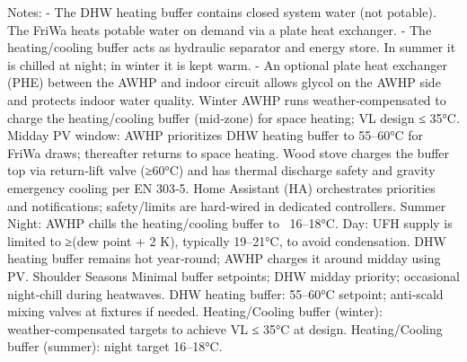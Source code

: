 \markdownRendererDocumentBegin
Notes: - The DHW heating buffer contains closed system water (not potable). The FriWa heats potable water on demand via a plate heat exchanger. - The heating/cooling buffer acts as hydraulic separator and energy store. In summer it is chilled at night; in winter it is kept warm. - An optional plate heat exchanger (PHE) between the AWHP and indoor circuit allows glycol on the AWHP side and protects indoor water quality.\markdownRendererInterblockSeparator
{}\markdownRendererSectionBegin
\markdownRendererSectionBegin
{}\markdownRendererInterblockSeparator
{}\markdownRendererUlBegin
\markdownRendererUlItem Winter\markdownRendererUlItemEnd 
\markdownRendererUlItem AWHP runs weather‑compensated to charge the heating/cooling buffer (mid‑zone) for space heating; VL design ≤ 35°C.\markdownRendererUlItemEnd 
\markdownRendererUlItem Midday PV window: AWHP prioritizes DHW heating buffer to 55–60°C for FriWa draws; thereafter returns to space heating.\markdownRendererUlItemEnd 
\markdownRendererUlItem Wood stove charges the buffer top via return‑lift valve (≥60°C) and has thermal discharge safety and gravity emergency cooling per EN 303‑5.\markdownRendererUlItemEnd 
\markdownRendererUlItem Home Assistant (HA) orchestrates priorities and notifications; safety/limits are hard‑wired in dedicated controllers.\markdownRendererUlItemEnd 
\markdownRendererUlItem Summer\markdownRendererUlItemEnd 
\markdownRendererUlItem Night: AWHP chills the heating/cooling buffer to ~16–18°C.\markdownRendererUlItemEnd 
\markdownRendererUlItem Day: UFH supply is limited to ≥(dew point + 2 K), typically 19–21°C, to avoid condensation.\markdownRendererUlItemEnd 
\markdownRendererUlItem DHW heating buffer remains hot year‑round; AWHP charges it around midday using PV.\markdownRendererUlItemEnd 
\markdownRendererUlItem Shoulder Seasons\markdownRendererUlItemEnd 
\markdownRendererUlItem Minimal buffer setpoints; DHW midday priority; occasional night‑chill during heatwaves.\markdownRendererUlItemEnd 
\markdownRendererUlEnd \markdownRendererInterblockSeparator
{}
\markdownRendererSectionEnd \markdownRendererSectionBegin
{}\markdownRendererInterblockSeparator
{}\markdownRendererUlBeginTight
\markdownRendererUlItem DHW heating buffer: 55–60°C setpoint; anti‑scald mixing valves at fixtures if needed.\markdownRendererUlItemEnd 
\markdownRendererUlItem Heating/Cooling buffer (winter): weather‑compensated targets to achieve VL ≤ 35°C at design.\markdownRendererUlItemEnd 
\markdownRendererUlItem Heating/Cooling buffer (summer): night target 16–18°C.\markdownRendererUlItemEnd 
